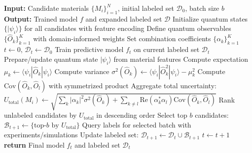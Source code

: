 \documentclass[conference]{IEEEtran}
\begin{document}
\begin{algorithm}
\caption{Quantum-inspired active learning}
\label{alg:quantum_al}
\begin{algorithmic}
\STATE \textbf{Input:} Candidate materials $\{M_i\}_{i=1}^N$, initial labeled set $\mathcal{D}_0$, batch size $b$
\STATE \textbf{Output:} Trained model $f$ and expanded labeled set $\mathcal{D}$
\STATE Initialize quantum states $\{|\psi_i\rangle\}$ for all candidates with feature encoding
\STATE Define quantum observables $\{\hat{O}_k\}_{k=1}^K$ with domain-informed weights
\STATE Set combination coefficients $\{\alpha_k\}_{k=1}^K$
\STATE $t \gets 0$, $\mathcal{D}_t \gets \mathcal{D}_0$
\REPEAT
\STATE Train predictive model $f_t$ on current labeled set $\mathcal{D}_t$
\STATE Prepare/update quantum state $|\psi_i\rangle$ from material features
\STATE Compute expectation $\mu_k \gets \langle\psi_i|\hat{O}_k|\psi_i\rangle$
\STATE Compute variance $\sigma^2(\hat{O}_k) \gets \langle\psi_i|\hat{O}_k^2|\psi_i\rangle - \mu_k^2$
\ENDFOR
{}
\STATE Compute $\text{Cov}(\hat{O}_k,\hat{O}_l)$ with symmetrized product
\ENDFOR
\STATE Aggregate total uncertainty: $U_{\text{total}}(M_i) \gets \sqrt{\sum_k |\alpha_k|^2 \sigma^2(\hat{O}_k) + \sum_{k \neq l} \text{Re}(\alpha_k^* \alpha_l) \text{Cov}(\hat{O}_k,\hat{O}_l)}$
\ENDFOR
\STATE Rank unlabeled candidates by $U_{\text{total}}$ in descending order
\STATE Select top $b$ candidates: $\mathcal{B}_{t+1} \gets \{\text{top-}b\text{ by } U_{\text{total}}\}$
\STATE Query labels for selected batch with experiments/simulations
\STATE Update labeled set: $\mathcal{D}_{t+1} \gets \mathcal{D}_t \cup \mathcal{B}_{t+1}$
\STATE $t \gets t + 1$
\STATE \textbf{return} Final model $f_t$ and labeled set $\mathcal{D}_t$
\end{algorithmic}
\end{algorithm}
\end{document}
